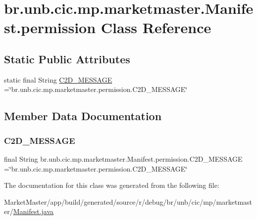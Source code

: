 \hypertarget{classbr_1_1unb_1_1cic_1_1mp_1_1marketmaster_1_1Manifest_1_1permission}{}\section{br.\+unb.\+cic.\+mp.\+marketmaster.\+Manifest.\+permission Class Reference}
\label{classbr_1_1unb_1_1cic_1_1mp_1_1marketmaster_1_1Manifest_1_1permission}
\subsection*{Static Public Attributes}
\begin{DoxyCompactItemize}
\item 
static final String \mbox{\hyperlink{classbr_1_1unb_1_1cic_1_1mp_1_1marketmaster_1_1Manifest_1_1permission_a23e58a75fae47338ff5c28f458de40b4}{C2\+D\+\_\+\+M\+E\+S\+S\+A\+GE}} =\char`\"{}br.\+unb.\+cic.\+mp.\+marketmaster.\+permission.\+C2\+D\+\_\+\+M\+E\+S\+S\+A\+GE\char`\"{}
\end{DoxyCompactItemize}


\subsection{Member Data Documentation}
\mbox{\label{classbr_1_1unb_1_1cic_1_1mp_1_1marketmaster_1_1Manifest_1_1permission_a23e58a75fae47338ff5c28f458de40b4}} 
\subsubsection{\texorpdfstring{C2\+D\+\_\+\+M\+E\+S\+S\+A\+GE}{C2D\_MESSAGE}}
{\footnotesize\ttfamily final String br.\+unb.\+cic.\+mp.\+marketmaster.\+Manifest.\+permission.\+C2\+D\+\_\+\+M\+E\+S\+S\+A\+GE =\char`\"{}br.\+unb.\+cic.\+mp.\+marketmaster.\+permission.\+C2\+D\+\_\+\+M\+E\+S\+S\+A\+GE\char`\"{}\hspace{0.3cm}{\ttfamily [static]}}



The documentation for this class was generated from the following file\+:\begin{DoxyCompactItemize}
\item 
Market\+Master/app/build/generated/source/r/debug/br/unb/cic/mp/marketmaster/\mbox{\hyperlink{Manifest_8java}{Manifest.\+java}}\end{DoxyCompactItemize}
